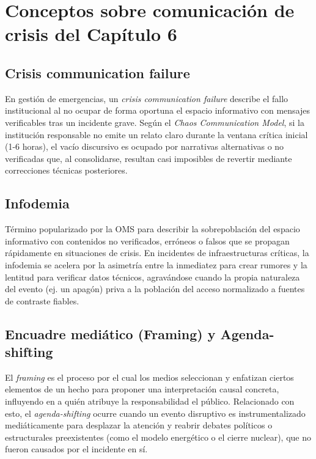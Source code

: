 
\chapter{Conceptos sobre comunicación de crisis del Capítulo 6}
\label{anexo:conceptos_cap6}

\section{Crisis communication failure}
\label{anexo:crisis_comm_failure}
En gestión de emergencias, un \textit{crisis communication failure} describe el fallo institucional al no ocupar de forma oportuna el espacio informativo con mensajes verificables tras un incidente grave. Según el \textit{Chaos Communication Model}, si la institución responsable no emite un relato claro durante la ventana crítica inicial (1-6 horas), el vacío discursivo es ocupado por narrativas alternativas o no verificadas que, al consolidarse, resultan casi imposibles de revertir mediante correcciones técnicas posteriores.

\section{Infodemia}
\label{anexo:infodemia}
Término popularizado por la OMS para describir la sobrepoblación del espacio informativo con contenidos no verificados, erróneos o falsos que se propagan rápidamente en situaciones de crisis. En incidentes de infraestructuras críticas, la infodemia se acelera por la asimetría entre la inmediatez para crear rumores y la lentitud para verificar datos técnicos, agravándose cuando la propia naturaleza del evento (ej. un apagón) priva a la población del acceso normalizado a fuentes de contraste fiables.

\section{Encuadre mediático (Framing) y Agenda-shifting}
\label{anexo:framing}
El \textit{framing} es el proceso por el cual los medios seleccionan y enfatizan ciertos elementos de un hecho para proponer una interpretación causal concreta, influyendo en a quién atribuye la responsabilidad el público. Relacionado con esto, el \textit{agenda-shifting} ocurre cuando un evento disruptivo es instrumentalizado mediáticamente para desplazar la atención y reabrir debates políticos o estructurales preexistentes (como el modelo energético o el cierre nuclear), que no fueron causados por el incidente en sí.

